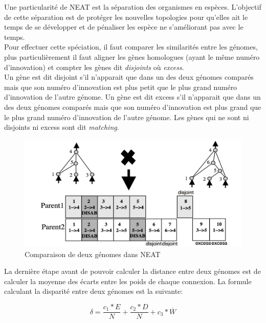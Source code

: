 \documentclass{article}
\begin{document}
Une particularité de NEAT est la séparation des organismes en espèces. L'objectif de cette séparation est de protéger les nouvelles topologies pour qu'elles ait le temps de se développer et de pénaliser les espèce ne s'améliorant pas avec le temps.\\ 

Pour effectuer cette spéciation, il faut comparer les similarités entre les génomes, plus particulièrement il faut aligner les gènes homologues (ayant le même numéro d'innovation) et compter les gènes dit \textit{disjoints} où \textit{excess}.\\
Un gène est dit disjoint s'il n'apparait que dans un des deux génomes comparés mais que son numéro d'innovation est plus petit que le plus grand numéro d'innovation de l'autre génome. Un gène est dit excess s'il n'apparait que dans un des deux génomes comparés mais que son numéro d'innovation est plus grand que le plus grand numéro d'innovation de l'autre génome. Les gènes qui ne sont ni disjoints ni excess sont dit \textit{matching}.

\begin{figure}[H]
\begin{center}
	\includegraphics[scale=0.4]{disjointexcess.png}
	\caption{Comparaison de deux génomes dans NEAT\cite{neatpaper}}
\end{center}
\end{figure}

La dernière étape avant de pouvoir calculer la distance entre deux génomes est de calculer la moyenne des écarts entre les poids de chaque connexion.
La formule calculant la disparité entre deux génomes est la suivante:

\begin{equation}
	\delta = \frac{c_1 * E}{N} + \frac{c_2 * D}{N} + c_3 * \overline{W}
\label{eq:delta}
\end{equation}
\end{document}
